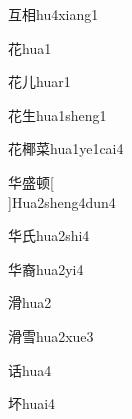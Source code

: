 \begin{verbete}[4;9]{互相}{hu4xiang1}
\end{verbete}

\begin{verbete}[7]{花}{hua1}
\end{verbete}

\begin{verbete}[7;2]{花儿}{huar1}
\end{verbete}

\begin{verbete}[7;5]{花生}{hua1sheng1}
\end{verbete}

\begin{verbete}[7;12;11]{花椰菜}{hua1ye1cai4}
\end{verbete}

\begin{verbete}[6;11;10]{华盛顿}[\\]{Hua2sheng4dun4}
\end{verbete}

\begin{verbete}[6;4]{华氏}{hua2shi4}
\end{verbete}

\begin{verbete}[6;13]{华裔}{hua2yi4}
\end{verbete}

\begin{verbete}[12]{滑}{hua2}
\end{verbete}

\begin{verbete}[12;11]{滑雪}{hua2xue3}
\end{verbete}

\begin{verbete}[8]{话}{hua4}
\end{verbete}

\begin{verbete}[7]{坏}{huai4}
\end{verbete}

